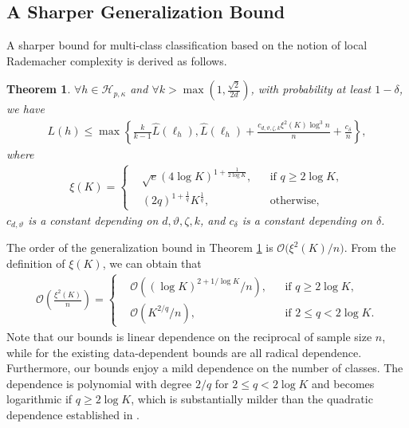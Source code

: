 \documentclass{article}
\newtheorem{theorem}{Theorem}
\begin{document}
\subsection{A Sharper Generalization Bound}
A sharper bound for multi-class classification based on
the notion of local Rademacher complexity is derived as follows.
\begin{theorem}
\label{theorem-finally}
  $\forall h\in\mathcal{H}_{p,\kappa}$ and $\forall k>\max(1,\frac{\sqrt{2}}{2d})$,  with probability at least
  $1-\delta$, we have
  \begin{align*}
   L(h)\leq \max\left\{
        \frac{k}{k-1}\hat{L}(\ell_h),
       \hat{L}(\ell_h)+\frac{c_{d,\vartheta,\zeta, k}\xi^2(K) \log^3 n}{n}+\frac{c_{\delta}}{n}
     \right\},
\end{align*}
where \begin{align*}
  \xi(K)=
  \left\{
      \begin{aligned}
      &\sqrt{e}(4\log K)^{1+\frac{1}{2\log K}}, &&\text{if } q\geq 2\log K,\\
      &(2q)^{1+\frac{1}{q}}K^{\frac{1}{q}}, &&\text{otherwise},
      \end{aligned}
      \right.
  \end{align*}
  $c_{d,\vartheta}$ is a constant depending on $d,\vartheta,\zeta, k$,
  and $c_{\delta}$ is a constant depending on $\delta$.
\end{theorem}

The order of the  generalization bound in Theorem \ref{theorem-finally} is
$
 \mathcal{O}\big({\xi^2(K)}/{n}\big).
$
From the definition of $\xi(K)$, we can obtain that
 \begin{align*}
  \mathcal{O}\left(\frac{\xi^2(K)}{n}\right)=
  \left\{
      \begin{aligned}
      &\mathcal{O}\left({(\log K)^{2+{1}/{\log K}}}/{n}\right), &&\text{if } q\geq 2\log K,\\
      &\mathcal{O}\left({K^{2/q}}/{n}\right), &&\text{if } 2\leq q< 2\log K.
      \end{aligned}
      \right.
  \end{align*}
  Note that our bounds is linear dependence on the reciprocal of sample size $n$,
  while for the existing data-dependent bounds are all radical dependence.
Furthermore,
  our bounds enjoy a mild dependence on the number of classes.
  The dependence is polynomial with degree $2/q$ for $2\leq q < 2\log K$ and
  becomes logarithmic if $q \geq 2\log K$,
  which is substantially milder than the quadratic dependence
  established in \cite{koltchinskii2002empirical,koltchinskii2001some,mohri2012foundations,cortes2013multi}.
\end{document}
